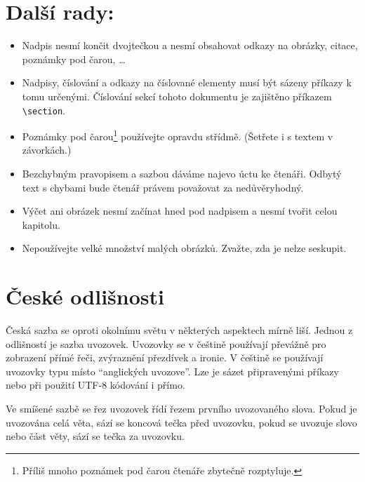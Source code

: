 \documentclass[10pt, a4paper, twocolumn]{article}
\begin{document}
\section{Další rady:} \label{sec:DalsiRady}

\begin{itemize}
    \item Nadpis nesmí končit dvojtečkou a nesmí obsahovat odkazy na obrázky, citace, poznámky pod čarou, \dots

    \item Nadpisy, číslování a odkazy na číslované elementy musí být sázeny příkazy k tomu určenými.
    Číslování sekcí tohoto dokumentu je zajištěno příkazem \verb|\section|.

    \item Poznámky pod čarou\footnote{Příliš mnoho poznámek pod čarou čtenáře zbytečně rozptyluje.} používejte opravdu střídmě.
    (Šetřete i s textem v závorkách.)

    \item Bezchybným pravopisem a sazbou dáváme najevo úctu ke čtenáři.
    Odbytý text s chybami bude čtenář právem považovat za nedůvěryhodný.

    \item Výčet ani obrázek nesmí začínat hned pod nadpisem a nesmí tvořit celou kapitolu.

    \item Nepoužívejte velké množství malých obrázků.
    Zvažte, zda je nelze seskupit.
    
\end{itemize}

\section{České odlišnosti}

Česká sazba se oproti okolnímu světu v některých aspektech mírně liší.
Jednou z odlišností je sazba uvozovek.
Uvozovky se v češtině používají převážně pro zobrazení přímé řeči, zvýraznění přezdívek a ironie.
V češtině se používají uvozovky typu  místo ``anglických uvozove''.
Lze je sázet připravenými příkazy nebo při použití UTF-8 kódování i přímo.

Ve smíšené sazbě se řez uvozovek řídí řezem prvního uvozovaného slova.
Pokud je uvozována celá věta, sází se koncová tečka před uvozovku, pokud se uvozuje slovo nebo část věty, sází se tečka za uvozovku.
\end{document}
